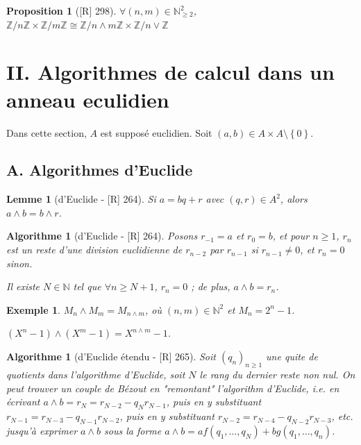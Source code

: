 \documentclass[10pt, a4paper, parskip=full, twoside, twocolumn]{report}
\newtheorem{proposition}[definition]{Proposition}
\newtheorem{lemma}[definition]{Lemme}
\newtheorem{example}[definition]{Exemple}
\newtheorem{algorithm}[definition]{Algorithme}
\newcommand{\IN}{\mathbb{N}}
\newcommand{\IZ}{\mathbb{Z}}
\newcommand{\IZnZ}{\mathbb{Z}/n\mathbb{Z}}
\begin{document}
\begin{proposition}[\textnormal{[R] 298}]
	$\forall (n,m)\in \IN^2_{\geq 2}$, $\IZnZ \times \IZ/m\IZ \cong \IZ/n\wedge m\IZ \times \IZ/ n\vee \IZ$
\end{proposition}

\section*{II. Algorithmes de calcul dans un anneau eculidien}
\textcolor{paragraphtext}{Dans cette section, $A$ est supposé euclidien.
Soit $(a,b)\in A\times A\setminus\left\{0\right\}$}.

\subsection*{A. Algorithmes d'Euclide}

\begin{lemma}[d'Euclide - \textnormal{[R] 264}]
	Si $a=bq+r$ avec $(q,r)\in A^2$, alors $a\wedge b = b\wedge r$.
\end{lemma}

\begin{algorithm}[d'Euclide - \textnormal{[R] 264}]
	Posons $r_{-1} = a$ et $r_0 = b$, et pour $n\geq 1$, $r_n$ est un 
	reste d'une division euclidienne de $r_{n-2}$ par $r_{n-1}$ si $r_{n-1} \neq 0$, et $r_n = 0$ sinon.

	Il existe $N\in \IN$ tel que $\forall n\geq N+1$, $r_n = 0$ ; de plus, $a\wedge b = r_n$.
\end{algorithm}

\begin{example}
	$M_n\wedge M_m = M_{n\wedge m}$, où $(n,m)\in \IN^2$ et $M_n = 2^n -1$.

	$(X^n-1)\wedge (X^m - 1) = X^{n\wedge m} - 1$.
\end{example}

\begin{algorithm}[d'Euclide étendu - \textnormal{[R] 265}]
	Soit $\left(q_n\right)_{n\geq 1}$ une quite de quotients dans l'algorithme d'Euclide,
	soit $N$ le rang du dernier reste non nul. On peut
	trouver un couple de Bézout en "remontant" l'algorithm d'Euclide, \emph{i.e.} en 
	écrivant $a\wedge b = r_N = r_{N-2} - q_Nr_{N-1}$, puis en y substituant $r_{N-1} = r_{N-3} - q_{N-1}r_{N-2}$,
	puis en y substituant $r_{N-2} = r_{N-4} - q_{N-2}r_{N-3}$, etc. jusqu'à exprimer $a\wedge b$ sous 
	la forme $a\wedge b = a f(q_1,\dots, q_N) + b g(q_1,\dots, q_n)$.
\end{algorithm}
\end{document}
